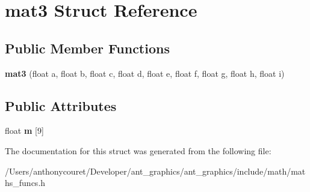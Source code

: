 \hypertarget{structmat3}{\section{mat3 Struct Reference}
\label{structmat3}
}
\subsection*{Public Member Functions}
\begin{DoxyCompactItemize}
\item 
\hypertarget{structmat3_ad5f393d1a6f7986207680e54e81f9906}{{\bfseries mat3} (float a, float b, float c, float d, float e, float f, float g, float h, float i)}\label{structmat3_ad5f393d1a6f7986207680e54e81f9906}

\end{DoxyCompactItemize}
\subsection*{Public Attributes}
\begin{DoxyCompactItemize}
\item 
\hypertarget{structmat3_af5c67cec8668816c844bfd3f097f9eb2}{float {\bfseries m} \mbox{[}9\mbox{]}}\label{structmat3_af5c67cec8668816c844bfd3f097f9eb2}

\end{DoxyCompactItemize}


The documentation for this struct was generated from the following file\+:\begin{DoxyCompactItemize}
\item 
/\+Users/anthonycouret/\+Developer/ant\+\_\+graphics/ant\+\_\+graphics/include/math/maths\+\_\+funcs.\+h\end{DoxyCompactItemize}
